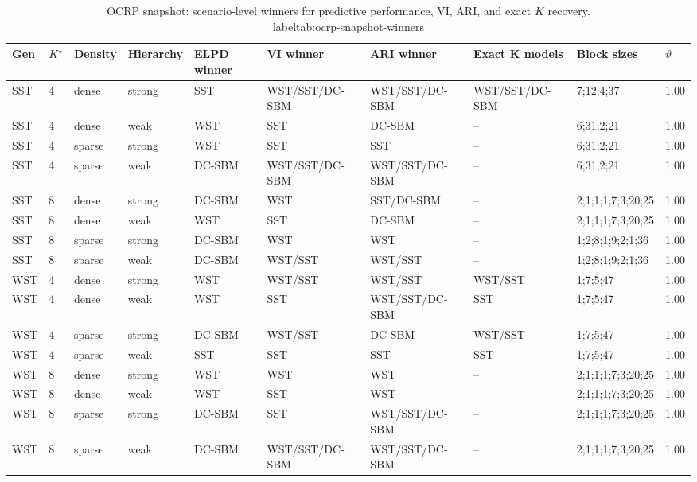 \begin{table}[!h]
\centering
\caption{OCRP snapshot: scenario-level winners for predictive performance, VI, ARI, and exact $K$ recovery.\\label{tab:ocrp-snapshot-winners}}
\centering
\begin{tabular}[t]{llllllllll}
\toprule
Gen & $K^\star$ & Density & Hierarchy & ELPD winner & VI winner & ARI winner & Exact K models & Block sizes & $\vartheta$\\
\midrule
SST & 4 & dense & strong & SST & WST/SST/DC-SBM & WST/SST/DC-SBM & WST/SST/DC-SBM & 7;12;4;37 & 1.00\\
SST & 4 & dense & weak & WST & SST & DC-SBM & -- & 6;31;2;21 & 1.00\\
SST & 4 & sparse & strong & WST & SST & SST & -- & 6;31;2;21 & 1.00\\
SST & 4 & sparse & weak & DC-SBM & WST/SST/DC-SBM & WST/SST/DC-SBM & -- & 6;31;2;21 & 1.00\\
SST & 8 & dense & strong & DC-SBM & WST & SST/DC-SBM & -- & 2;1;1;1;7;3;20;25 & 1.00\\
SST & 8 & dense & weak & WST & SST & DC-SBM & -- & 2;1;1;1;7;3;20;25 & 1.00\\
SST & 8 & sparse & strong & DC-SBM & WST & WST & -- & 1;2;8;1;9;2;1;36 & 1.00\\
SST & 8 & sparse & weak & DC-SBM & WST/SST & WST/SST & -- & 1;2;8;1;9;2;1;36 & 1.00\\
WST & 4 & dense & strong & WST & WST/SST & WST/SST & WST/SST & 1;7;5;47 & 1.00\\
WST & 4 & dense & weak & WST & SST & WST/SST/DC-SBM & SST & 1;7;5;47 & 1.00\\
WST & 4 & sparse & strong & DC-SBM & WST/SST & DC-SBM & WST/SST & 1;7;5;47 & 1.00\\
WST & 4 & sparse & weak & SST & SST & SST & SST & 1;7;5;47 & 1.00\\
WST & 8 & dense & strong & WST & WST & WST & -- & 2;1;1;1;7;3;20;25 & 1.00\\
WST & 8 & dense & weak & WST & SST & WST & -- & 2;1;1;1;7;3;20;25 & 1.00\\
WST & 8 & sparse & strong & DC-SBM & SST & WST/SST/DC-SBM & -- & 2;1;1;1;7;3;20;25 & 1.00\\
WST & 8 & sparse & weak & DC-SBM & WST/SST/DC-SBM & WST/SST/DC-SBM & -- & 2;1;1;1;7;3;20;25 & 1.00\\
\bottomrule
\end{tabular}
\end{table}
